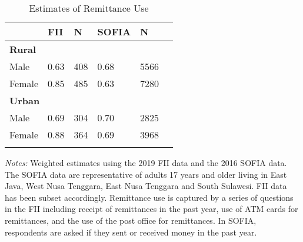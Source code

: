 \begin{table}[H] \begin{adjustbox}{max width=1.3\textwidth} \begin{threeparttable} \caption{Estimates of Remittance Use} \label{remitcompate} {\begin{tabular}{l*{1}{lllll}} \hline \toprule &{FII}&{N}&{SOFIA}&{N} \\ \midrule \multicolumn{5}{l}{\textbf{Rural}} \\
\hline
Male            &     0.63&      408&     0.68&     5566\\
Female          &     0.85&      485&     0.63&     7280\\
\hline \multicolumn{5}{l}{\textbf{Urban}} \\
\hline
Male            &     0.69&      304&     0.70&     2825\\
Female          &     0.88&      364&     0.69&     3968\\
 \bottomrule \addlinespace[1.5ex] \end{tabular}} \begin{tablenotes}[flushleft]  \small \item \emph{Notes:} Weighted estimates using the 2019 FII data and the 2016 SOFIA data. The SOFIA data are representative of adults 17 years and older living in East Java, West Nusa Tenggara, East Nusa Tenggara and South Sulawesi. FII data has been subset accordingly. Remittance use is captured by a series of questions in the FII including receipt of remittances in the past year, use of ATM cards for remittances, and the use of the post office for remittances. In SOFIA, respondents are asked if they sent or received money in the past year. \end{tablenotes} \end{threeparttable} \end{adjustbox} \end{table} \vspace*{-5mm}
